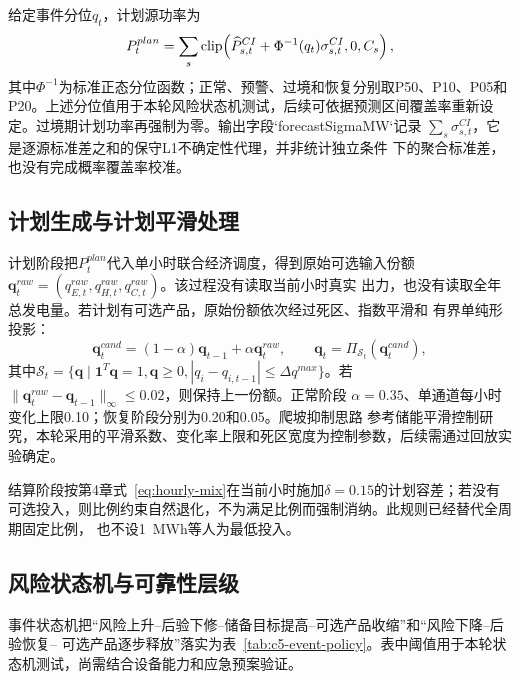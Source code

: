 给定事件分位$q_t$，计划源功率为
\begin{equation}
P_t^{plan}=\sum_s
\operatorname{clip}\!\left(
\widehat P_{s,t}^{CI}+\Phi^{-1}(q_t)\sigma_{s,t}^{CI},
0,C_s\right),
\label{eq:c5-risk-forecast}
\end{equation}
其中$\Phi^{-1}$为标准正态分位函数；正常、预警、过境和恢复分别取P50、P10、P05和
P20。上述分位值用于本轮风险状态机测试，后续可依据预测区间覆盖率重新设定。过境期计划功率再强制为零。输出字段`forecastSigmaMW`记录
$\sum_s\sigma_{s,t}^{CI}$，它是逐源标准差之和的保守L1不确定性代理，并非统计独立条件
下的聚合标准差，也没有完成概率覆盖率校准。

\subsection{计划生成与计划平滑处理}

计划阶段把$P_t^{plan}$代入单小时联合经济调度，得到原始可选输入份额
$\bm q_t^{raw}=(q_{E,t}^{raw},q_{H,t}^{raw},q_{C,t}^{raw})$。该过程没有读取当前小时真实
出力，也没有读取全年总发电量。若计划有可选产品，原始份额依次经过死区、指数平滑和
有界单纯形投影：
\begin{equation}
\bm q_t^{cand}=(1-\alpha)\bm q_{t-1}+\alpha\bm q_t^{raw},
\qquad
\bm q_t=\Pi_{\mathcal S_t}(\bm q_t^{cand}),
\label{eq:c5-anti-jitter}
\end{equation}
其中$\mathcal S_t=\{\bm q\mid\bm 1^T\bm q=1,\bm q\ge0,
|q_i-q_{i,t-1}|\le\Delta q^{max}\}$。若
$\|\bm q_t^{raw}-\bm q_{t-1}\|_{\infty}\le0.02$，则保持上一份额。正常阶段
$\alpha=0.35$、单通道每小时变化上限0.10；恢复阶段分别为0.20和0.05。爬坡抑制思路
参考储能平滑控制研究\cite{teleke2010}，本轮采用的平滑系数、变化率上限和死区宽度为控制参数，后续需通过回放实验确定。

结算阶段按第4章式~\eqref{eq:hourly-mix}在当前小时施加$\delta=0.15$的计划容差；若没有
可选投入，则比例约束自然退化，不为满足比例而强制消纳。此规则已经替代全周期固定比例，
也不设1~MWh等人为最低投入。

\subsection{风险状态机与可靠性层级}

事件状态机把“风险上升--后验下修--储备目标提高--可选产品收缩”和“风险下降--后验恢复--
可选产品逐步释放”落实为表~\ref{tab:c5-event-policy}。表中阈值用于本轮状态机测试，尚需结合设备能力和应急预案验证。

